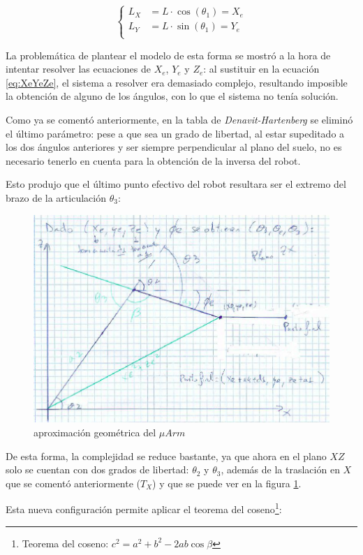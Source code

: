 \documentclass[a4paper,12pt]{article}
\begin{document}
\begin{equation} \label{eq:lx_ly_equations}
    \left\{
    \begin{aligned}
        L_X & = L \cdot \cos(\theta_1) = X_e \\
        L_Y & = L \cdot \sin(\theta_1) = Y_e \\
    \end{aligned}
    \right.
\end{equation}

La problemática de plantear el modelo de esta forma se mostró a la hora de intentar
resolver las ecuaciones de $X_e$, $Y_e$ y $Z_e$: al sustituir en la ecuación \ref{eq:XeYeZe},
el sistema a resolver era demasiado complejo, resultando imposible la obtención
de alguno de los ángulos, con lo que el sistema no tenía solución.

Como ya se comentó anteriormente, en la tabla de \textit{Denavit-Hartenberg} se eliminó
el último parámetro: pese a que sea un grado de libertad, al estar supeditado a los dos
ángulos anteriores y ser siempre perpendicular al plano del suelo, no es necesario
tenerlo en cuenta para la obtención de la inversa del robot.

Esto produjo que el último punto efectivo del robot resultara ser el extremo del brazo
de la articulación $\theta_3$:

\begin{figure}[H]
    \centering
    \includegraphics[width=.5\linewidth]{images/ik_schematic.png}
    \caption{aproximación geométrica del $\mu Arm$}
    \label{fig:ik_uarm}
\end{figure}

De esta forma, la complejidad se reduce bastante, ya que ahora en el plano $XZ$ solo
se cuentan con dos grados de libertad: $\theta_2$ y $\theta_3$, además de la traslación
en $X$ que se comentó anteriormente ($T_X$) y que se puede ver en la figura \ref{fig:ik_uarm}.

Esta nueva configuración permite aplicar el teorema del coseno\footnote
{Teorema del coseno: $c^2 = a^2 + b^2 - 2ab\cos\beta$}:
\end{document}
